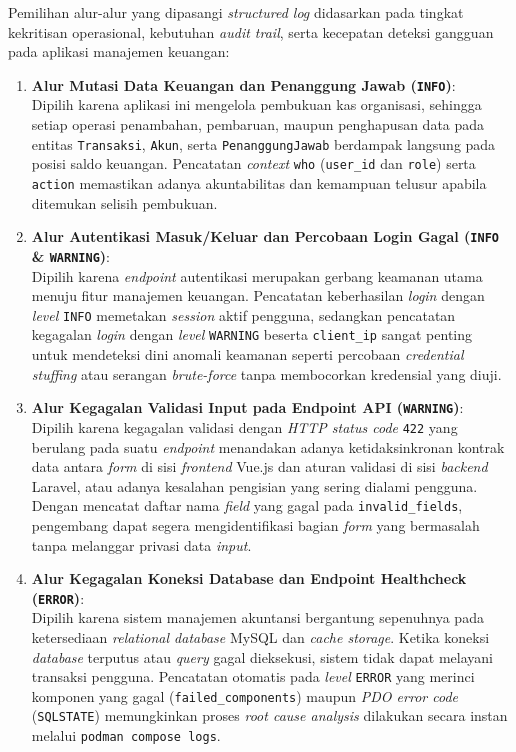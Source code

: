 \documentclass[a4paper,oneside,11pt]{book}
\begin{document}
\par Pemilihan alur-alur yang dipasangi \textit{structured log} didasarkan pada tingkat kekritisan operasional, kebutuhan \textit{audit trail}, serta kecepatan deteksi gangguan pada aplikasi manajemen keuangan:
\begin{enumerate}[leftmargin=*]
  \item \textbf{Alur Mutasi Data Keuangan dan Penanggung Jawab (\texttt{INFO})}:\\
        Dipilih karena aplikasi ini mengelola pembukuan kas organisasi, sehingga setiap operasi penambahan, pembaruan, maupun penghapusan data pada entitas \texttt{Transaksi}, \texttt{Akun}, serta \texttt{PenanggungJawab} berdampak langsung pada posisi saldo keuangan. Pencatatan \textit{context} \texttt{who} (\texttt{user\_id} dan \texttt{role}) serta \texttt{action} memastikan adanya akuntabilitas dan kemampuan telusur apabila ditemukan selisih pembukuan.
  \item \textbf{Alur Autentikasi Masuk/Keluar dan Percobaan Login Gagal (\texttt{INFO} \& \texttt{WARNING})}:\\
        Dipilih karena \textit{endpoint} autentikasi merupakan gerbang keamanan utama menuju fitur manajemen keuangan. Pencatatan keberhasilan \textit{login} dengan \textit{level} \texttt{INFO} memetakan \textit{session} aktif pengguna, sedangkan pencatatan kegagalan \textit{login} dengan \textit{level} \texttt{WARNING} beserta \texttt{client\_ip} sangat penting untuk mendeteksi dini anomali keamanan seperti percobaan \textit{credential stuffing} atau serangan \textit{brute-force} tanpa membocorkan kredensial yang diuji.
  \item \textbf{Alur Kegagalan Validasi Input pada Endpoint API (\texttt{WARNING})}:\\
        Dipilih karena kegagalan validasi dengan \textit{HTTP status code} \texttt{422} yang berulang pada suatu \textit{endpoint} menandakan adanya ketidaksinkronan kontrak data antara \textit{form} di sisi \textit{frontend} Vue.js dan aturan validasi di sisi \textit{backend} Laravel, atau adanya kesalahan pengisian yang sering dialami pengguna. Dengan mencatat daftar nama \textit{field} yang gagal pada \texttt{invalid\_fields}, pengembang dapat segera mengidentifikasi bagian \textit{form} yang bermasalah tanpa melanggar privasi data \textit{input}.
  \item \textbf{Alur Kegagalan Koneksi Database dan Endpoint Healthcheck (\texttt{ERROR})}:\\
        Dipilih karena sistem manajemen akuntansi bergantung sepenuhnya pada ketersediaan \textit{relational database} MySQL dan \textit{cache storage}. Ketika koneksi \textit{database} terputus atau \textit{query} gagal dieksekusi, sistem tidak dapat melayani transaksi pengguna. Pencatatan otomatis pada \textit{level} \texttt{ERROR} yang merinci komponen yang gagal (\texttt{failed\_components}) maupun \textit{PDO error code} (\texttt{SQLSTATE}) memungkinkan proses \textit{root cause analysis} dilakukan secara instan melalui \texttt{podman compose logs}.
\end{enumerate}
\end{document}
